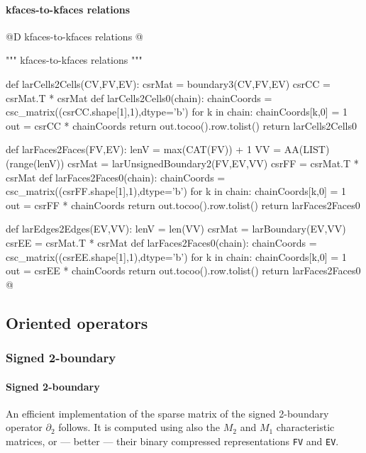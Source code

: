 \documentclass[11pt,oneside]{article}    %
\begin{document}
\paragraph{kfaces-to-kfaces relations}
@D kfaces-to-kfaces relations
@{""" kfaces-to-kfaces relations """

def larCells2Cells(CV,FV,EV):
    csrMat = boundary3(CV,FV,EV)
    csrCC = csrMat.T * csrMat
    def larCells2Cells0(chain):
        chainCoords = csc_matrix((csrCC.shape[1],1),dtype='b')
        for k in chain: chainCoords[k,0] = 1
        out = csrCC * chainCoords
        return out.tocoo().row.tolist()
    return larCells2Cells0

def larFaces2Faces(FV,EV):
    lenV = max(CAT(FV)) + 1
    VV = AA(LIST)(range(lenV))
    csrMat = larUnsignedBoundary2(FV,EV,VV)
    csrFF = csrMat.T * csrMat
    def larFaces2Faces0(chain):
        chainCoords = csc_matrix((csrFF.shape[1],1),dtype='b')
        for k in chain: chainCoords[k,0] = 1
        out = csrFF * chainCoords
        return out.tocoo().row.tolist()
    return larFaces2Faces0

def larEdges2Edges(EV,VV):
    lenV = len(VV)
    csrMat = larBoundary(EV,VV)
    csrEE = csrMat.T * csrMat
    def larFaces2Faces0(chain):
        chainCoords = csc_matrix((csrEE.shape[1],1),dtype='b')
        for k in chain: chainCoords[k,0] = 1
        out = csrEE * chainCoords
        return out.tocoo().row.tolist()
    return larFaces2Faces0
@}



\subsection{Oriented operators}

\subsubsection{Signed 2-boundary}


\paragraph{Signed 2-boundary} An efficient implementation of the sparse matrix of the  signed 2-boundary operator $\partial_2$ follows.
It is computed using also the $M_2$ and $M_1$ characteristic matrices, or --- better --- their binary compressed representations \texttt{FV} and \texttt{EV}.
\end{document}
